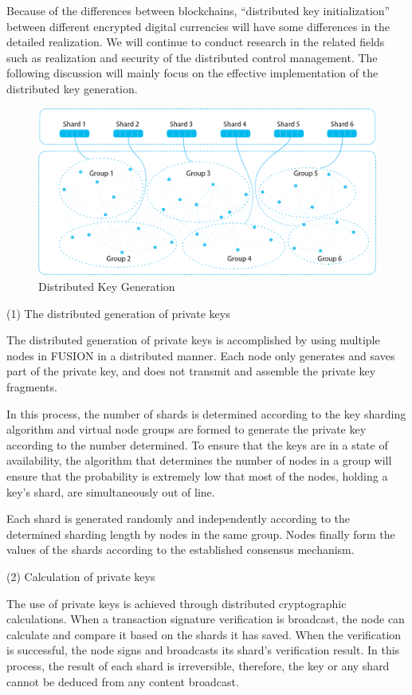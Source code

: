 \documentclass[a4paper,12pt]{article}
\begin{document}
Because of the differences between blockchains, “distributed key initialization” between different encrypted digital currencies will have some differences in the detailed realization. We will continue to conduct research in the related fields such as realization and security of the distributed control management. The following discussion will mainly focus on the effective implementation of the distributed key generation.

\begin{figure} [htbp]
\centering \includegraphics [width = 5in]{pic/keygeneration.png}
\caption{Distributed Key Generation} \label{fig: 1}
\end{figure}

(1) The distributed generation of private keys

The distributed generation of private keys is accomplished by using multiple nodes in FUSION in a distributed manner. Each node only generates and saves part of the private key, and does not transmit and assemble the private key fragments.

In this process, the number of shards is determined according to the key sharding algorithm and virtual node groups are formed to generate the private key according to the number determined. To ensure that the keys are in a state of availability, the algorithm that determines the number of nodes in a group will ensure that the probability is extremely low that most of the nodes, holding a key's shard, are simultaneously out of line.

Each shard is generated randomly and independently according to the determined sharding length by nodes in the same group. Nodes finally form the values of the shards according to the established consensus mechanism.

(2) Calculation of private keys

The use of private keys is achieved through distributed cryptographic calculations. When a transaction signature verification is broadcast, the node can calculate and compare it based on the shards it has saved. When the verification is successful, the node signs and broadcasts its shard's verification result. In this process, the result of each shard is irreversible, therefore, the key or any shard cannot be deduced from any content broadcast.
\end{document}

